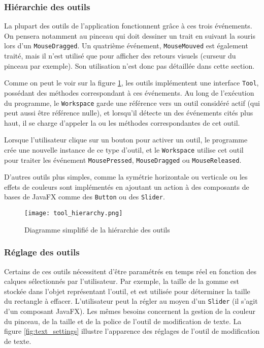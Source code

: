 \subsubsection{Hiérarchie des outils}
\label{section_outils}
La plupart des outils de l'application fonctionnent grâce à ces trois événements. On pensera notamment au pinceau qui doit dessiner un trait en suivant la souris lors d'un \texttt{MouseDragged}. Un quatrième événement, \texttt{MouseMouved} est également traité, mais il n'est utilisé que pour afficher des retours visuels (curseur du pinceau par exemple). Son utilisation n'est donc pas détaillée dans cette section.
\par
Comme on peut le voir sur la figure \ref{fig:tool_hier}, les outils implémentent une interface \texttt{Tool}, possédant des méthodes correspondant à ces événements. Au long de l'exécution du programme, le \texttt{Workspace} garde une référence vers un outil considéré actif (qui peut aussi être référence nulle), et lorsqu'il détecte un des événements cités plus haut, il se charge d'appeler la ou les méthodes correspondantes de cet outil.
\par
Lorsque l'utilisateur clique sur un bouton pour activer un outil, le programme crée une nouvelle instance de ce type d'outil, et le \texttt{Workspace} utilise cet outil pour traiter les événement \texttt{MousePressed}, \texttt{MouseDragged} ou \texttt{MouseReleased}.
\par
D'autres outils plus simples, comme la symétrie horizontale ou verticale ou les effets de couleurs sont implémentés en ajoutant un action à des composants de bases de JavaFX comme des \texttt{Button} ou des \texttt{Slider}.

\begin{figure}[!ht]
	\caption{Diagramme simplifié de la hiérarchie des outils}
	\centering
	\texttt{[image: tool\_hierarchy.png]}
	\label{fig:tool_hier}
\end{figure}

\subsubsection{Réglage des outils} \label{reglage-outils}
Certains de ces outils nécessitent d'être paramétrés en temps réel en fonction des calques sélectionnés par l'utilisateur. Par exemple, la taille de la gomme est stockée dans l'objet représentant l'outil, et est utilisée pour déterminer la taille du rectangle à effacer. L'utilisateur peut la régler au moyen d'un \texttt{Slider} (il s'agit d'un composant JavaFX). Les mêmes besoins concernent la gestion de la couleur du pinceau, de la taille et de la police de l'outil de modification de texte. La figure \ref{fig:text_settings} illustre l'apparence des réglages de l'outil de modification de texte.

